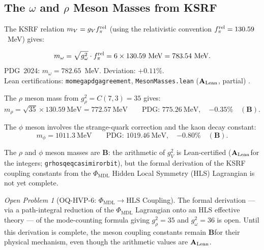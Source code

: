 \documentclass[11pt,openany]{book}
\theoremstyle{remark}
\newtheorem{openprob}{Open Problem}[chapter]
\newcommand{\PHIMDL}{\Phi_{\mathrm{MDL}}}
\newcommand{\lean}[1]{%
  \penalty-100
  \begingroup\def\_{\textunderscore\allowbreak}\texttt{#1}\endgroup}
\newcommand{\CatAL}{\ensuremath{\textbf{A}_{\rm Lean}}}
\newcommand{\CatB}{\textbf{B}}
\begin{document}
\subsection*{The $\omega$ and $\rho$ Meson Masses from KSRF}

The KSRF relation $m_V = g_V f_\pi^{\rm rel}$ (using the relativistic convention
$f_\pi^{\rm rel} = 130.59$~MeV) gives:

\begin{tcolorbox}[colback=orange!5,colframe=orange!60,title={Headline Result: $\omega$ Meson Mass (\CatAL)}]
\[
  m_\omega = \sqrt{g_\omega^2}\cdot f_\pi^{\rm rel}
  = 6 \times 130.59~\text{MeV} = 783.54~\text{MeV}.
\]
PDG~2024: $m_\omega = 782.65$~MeV.  Deviation: $+0.11\%$.\\[2pt]
Lean certifications: \lean{m\_omega\_pdg\_agreement}, \lean{MesonMasses.lean} (\CatAL,
partial) \cite{SpivackGTEQCDStructure,SpivackGTEUnification}.
\end{tcolorbox}

The $\rho$ meson mass from $g_\rho^2 = C(7,3) = 35$ gives:
\begin{equation}
  m_\rho = \sqrt{35} \times 130.59~\text{MeV} = 772.57~\text{MeV}
  \qquad\text{PDG: } 775.26~\text{MeV},\quad{-0.35\%} \quad (\CatB).
  \label{eq:m_rho}
\end{equation}

The $\phi$ meson involves the strange-quark correction and the kaon decay constant:
\begin{equation}
  m_\phi = 1011.3~\text{MeV} \qquad\text{PDG: }1019.46~\text{MeV},\quad{-0.80\%}
  \quad (\CatB).
\end{equation}

The $\rho$ and $\phi$ meson masses are \CatB: the arithmetic of $g_V^2$ is Lean-certified
(\CatAL for the integers; \lean{g\_rho\_sq\_eq\_casimir\_orbit}), but the formal
derivation of the KSRF coupling constants from the $\PHIMDL$ Hidden Local Symmetry (HLS)
Lagrangian is not yet complete.

\begin{openprob}[OQ-HVP-6: $\PHIMDL\to\text{HLS}$ Coupling]
\label{oprob:hvp6}
The formal derivation --- via a path-integral reduction of the $\PHIMDL$ Lagrangian onto
an HLS effective theory --- of the mode-counting formula giving $g_\rho^2 = 35$ and
$g_\omega^2 = 36$ is open.  Until this derivation is complete, the meson coupling
constants remain \CatB for their physical mechanism, even though the arithmetic
values are \CatAL.
\end{openprob}
\end{document}
